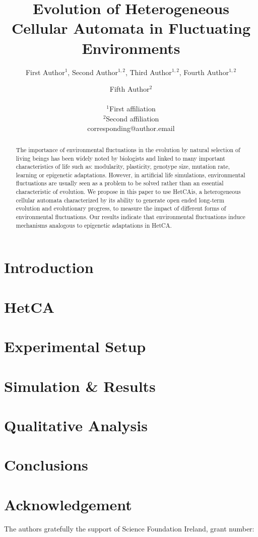 \documentclass[letterpaper]{article}
\title{Evolution of Heterogeneous Cellular Automata in Fluctuating Environments}
\author{First Author$^{1}$, Second Author$^{1,2}$, Third Author$^{1,2}$, Fourth Author$^{1,2}$ \and Fifth Author$^2$ \\
\mbox{}\\
$^1$First affiliation  \\
$^2$Second affiliation \\
corresponding@author.email}
\begin{document}
\maketitle

\begin{abstract}
The importance of environmental fluctuations in the evolution by natural selection of living beings has been widely noted by biologists and linked to many important characteristics of life such as: modularity, plasticity, genotype size, mutation rate, learning or epigenetic adaptations. However, in artificial life simulations, environmental fluctuations are usually seen as a problem to be solved rather than an essential characteristic of evolution. We propose in this paper to use HetCAis, a heterogeneous cellular automata characterized by its ability to generate open ended long-term evolution and evolutionary progress, to measure the impact of different forms of environmental fluctuations. Our results indicate that environmental fluctuations induce mechanisms analogous to epigenetic adaptations in HetCA.
\end{abstract}



\section{Introduction}\label{sec:intro}



%

\section{HetCA}\label{sec:hetca)}


\section{Experimental Setup}\label{sec:exsetup}


\section{Simulation \& Results}\label{sec:method}




\section{Qualitative Analysis}



\section{Conclusions}\label{sec:conc}


\section{Acknowledgement}
The authors gratefully the support of Science Foundation Ireland, grant number:


\end{document}
